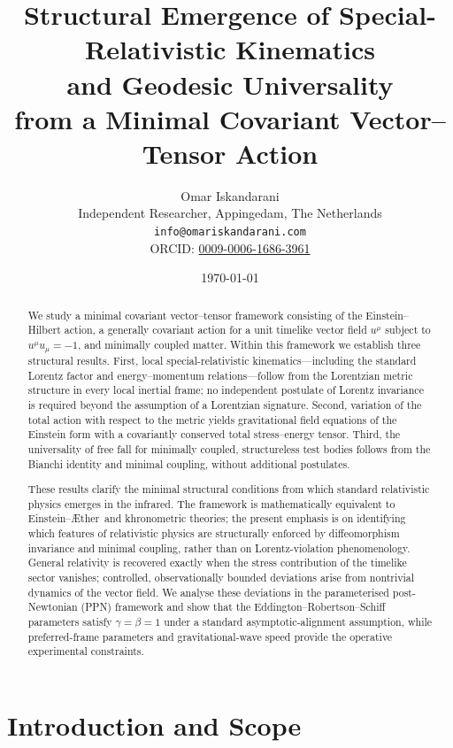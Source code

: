 \documentclass[12pt,a4paper]{article}
\title{Structural Emergence of Special-Relativistic Kinematics\\
       and Geodesic Universality\\
       from a Minimal Covariant Vector--Tensor Action}
\author{%
  Omar Iskandarani\\[0.25em]
  \normalsize Independent Researcher, Appingedam, The Netherlands\\
  \normalsize \texttt{info@omariskandarani.com}\\
  \normalsize ORCID: \href{https://orcid.org/0009-0006-1686-3961}{0009-0006-1686-3961}%
}
\date{\today}
\newcommand{\Aether}{\AE ther}
\begin{document}
\maketitle

\begin{abstract}

We study a minimal covariant vector--tensor framework consisting of the
Einstein--Hilbert action, a generally covariant action for a unit timelike
vector field $u^{\mu}$ subject to $u^{\mu}u_{\mu}=-1$, and minimally coupled
matter. Within this framework we establish three structural results. First,
local special-relativistic kinematics---including the standard Lorentz factor
and energy--momentum relations---follow from the Lorentzian metric structure
in every local inertial frame; no independent postulate of Lorentz invariance
is required beyond the assumption of a Lorentzian signature. Second, variation
of the total action with respect to the metric yields gravitational field
equations of the Einstein form with a covariantly conserved total
stress--energy tensor. Third, the universality of free fall for minimally
coupled, structureless test bodies follows from the Bianchi identity and
minimal coupling, without additional postulates.

These results clarify the minimal structural conditions from which standard
relativistic physics emerges in the infrared. The framework is mathematically
equivalent to Einstein--\Aether\ and khronometric theories; the present
emphasis is on identifying which features of relativistic physics are
structurally enforced by diffeomorphism invariance and minimal coupling,
rather than on Lorentz-violation phenomenology. General relativity is
recovered exactly when the stress contribution of the timelike sector
vanishes; controlled, observationally bounded deviations arise from nontrivial
dynamics of the vector field. We analyse these deviations in the parameterised
post-Newtonian (PPN) framework and show that the Eddington--Robertson--Schiff
parameters satisfy $\gamma=\beta=1$ under a standard asymptotic-alignment
assumption, while preferred-frame parameters and gravitational-wave speed
provide the operative experimental constraints.
\end{abstract}

\section{Introduction and Scope}
\label{sec:intro}
\end{document}
